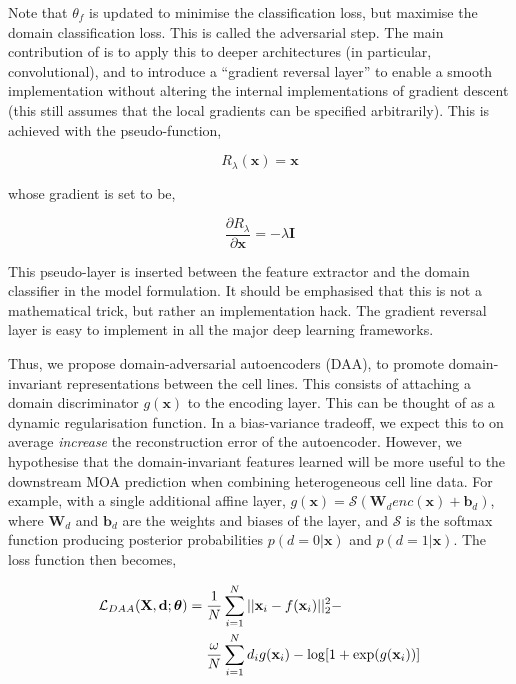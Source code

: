 Note that $\theta_f$ is updated to minimise the classification loss, but maximise the domain classification loss. This is called the adversarial step. The main contribution of \cite{ganin2014unsupervised} is to apply this to deeper architectures (in particular, convolutional), and to introduce a ``gradient reversal layer'' to enable a smooth implementation without altering the internal implementations of gradient descent (this still assumes that the local gradients can be specified arbitrarily). This is achieved with the pseudo-function,

$$R_\lambda(\mathbf{x}) = \mathbf{x}$$

whose gradient is set to be,

$$\frac{\partial R_\lambda}{\partial\mathbf{x}} = -\lambda\mathbf{I}$$

This pseudo-layer is inserted between the feature extractor and the domain classifier in the model formulation. It should be emphasised that this is not a mathematical trick, but rather an implementation hack. The gradient reversal layer is easy to implement in all the major deep learning frameworks.

Thus, we propose domain-adversarial autoencoders (DAA), to promote domain-invariant representations between the cell lines. This consists of attaching a domain discriminator $g(\mathbf{x})$ to the encoding layer. This can be thought of as a dynamic regularisation function. In a bias-variance tradeoff, we expect this to on average \emph{increase} the reconstruction error of the autoencoder. However, we hypothesise that the domain-invariant features learned will be more useful to the downstream MOA prediction when combining heterogeneous cell line data. For example, with a single additional affine layer, $g(\mathbf{x}) = \mathcal{S}(\mathbf{W}_denc(\mathbf{x}) + \mathbf{b}_d)$, where $\mathbf{W}_d$ and $\mathbf{b}_d$ are the weights and biases of the layer, and $\mathcal{S}$ is the softmax function producing posterior probabilities $p(d = 0 | \mathbf{x})$ and $p(d = 1 | \mathbf{x})$. The loss function then becomes,

\begin{align}\label{equ:da}
\mathcal{L}_{DAA}(\mathbf{X}, \mathbf{d} ; \boldsymbol\theta) ={} & \frac{1}{N}\sum_{i=1}^N||\mathbf{x}_i - f(\mathbf{x}_i)||_2^2 - \\ \notag
& \frac{\omega}{N}\sum_{i=1}^N d_ig(\mathbf{x}_i) - \log[1 + \exp(g(\mathbf{x}_i))] \notag
\end{align}


